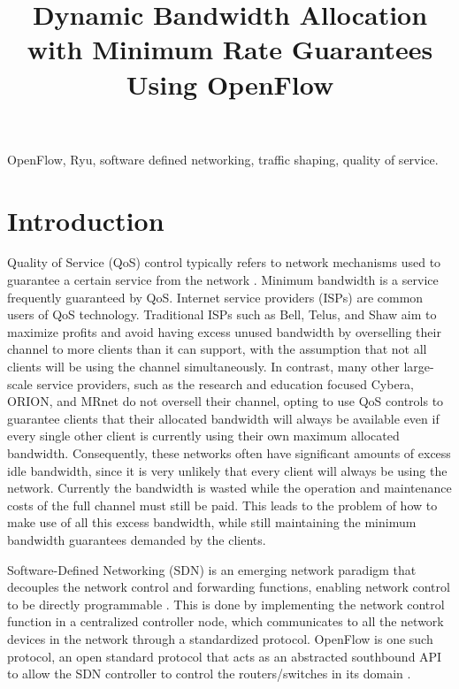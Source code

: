 \documentclass[accepted,single]{gipaper}
\title{Dynamic Bandwidth Allocation with Minimum Rate Guarantees Using OpenFlow}
\affiliation{
    Department of Computer Science \\
    University of Calgary
}
\begin{document}
\begin{keywords}
OpenFlow, Ryu, software defined networking, traffic shaping, quality of service.
\end{keywords}

\section{Introduction}
\label{intro}

Quality of Service (QoS) control typically refers to network mechanisms used to guarantee a certain service from the network \cite{Krishna:2016}. Minimum bandwidth is a service frequently guaranteed by QoS. Internet service providers (ISPs) are common users of QoS technology. Traditional ISPs such as Bell, Telus, and Shaw aim to maximize profits and avoid having excess unused bandwidth by overselling their channel to more clients than it can support, with the assumption that not all clients will be using the channel simultaneously. In contrast, many other large-scale service providers, such as the research and education focused Cybera, ORION, and MRnet do not oversell their channel, opting to use QoS controls to guarantee clients that their allocated bandwidth will always be available even if every single other client is currently using their own maximum allocated bandwidth. Consequently, these networks often have significant amounts of excess idle bandwidth, since it is very unlikely that every client will always be using the network. Currently the bandwidth is wasted while the operation and maintenance costs of the full channel must still be paid. This leads to the problem of how to make use of all this excess bandwidth, while still maintaining the minimum bandwidth guarantees demanded by the clients.

Software-Defined Networking (SDN) is an emerging network paradigm that decouples the network control and forwarding functions, enabling network control to be directly programmable \cite{opennetworking}. This is done by implementing the network control function in a centralized controller node, which communicates to all the network devices in the network through a standardized protocol. OpenFlow is one such protocol, an open standard protocol that acts as an abstracted southbound API to allow the SDN controller to control the routers/switches in its domain \cite{sdx}.
\end{document}
